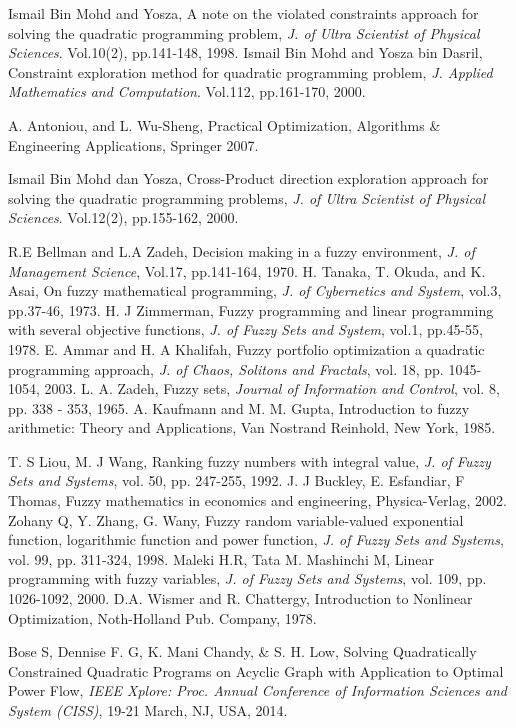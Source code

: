 \documentclass{iaesarticle3}
\begin{document}
\begin{thebibliography}{4}

    Ismail Bin Mohd and Yosza, A note on the violated constraints approach for solving the quadratic programming problem, \emph{J. of Ultra Scientist of Physical Sciences}.  Vol.10(2), pp.141-148, 1998.
    Ismail Bin Mohd and Yosza bin Dasril, Constraint exploration method for quadratic programming problem, \emph{J. Applied Mathematics and Computation}. Vol.112, pp.161-170, 2000.

    A. Antoniou, and L. Wu-Sheng, Practical Optimization, Algorithms \& Engineering Applications, Springer 2007.

    Ismail Bin Mohd dan Yosza, Cross-Product direction exploration approach for solving the quadratic programming problems, \emph{J. of Ultra Scientist of Physical Sciences}. Vol.12(2), pp.155-162, 2000.

    R.E Bellman and L.A Zadeh, Decision making in a fuzzy environment, \emph{J. of Management Science}, Vol.17, pp.141-164, 1970.
    H. Tanaka, T. Okuda, and K. Asai, On fuzzy mathematical programming, \emph{J. of Cybernetics and System}, vol.3, pp.37-46, 1973.
    H. J Zimmerman, Fuzzy programming and linear programming with several objective functions, \emph{J. of Fuzzy Sets and System}, vol.1, pp.45-55, 1978.
    E. Ammar and H. A Khalifah, Fuzzy portfolio optimization a quadratic programming approach, \emph{J. of Chaos, Solitons and Fractals}, vol. 18, pp. 1045-1054,  2003.
    L. A. Zadeh, Fuzzy sets, \emph{Journal of Information and Control}, vol. 8, pp. 338 - 353, 1965.
    A. Kaufmann and M. M. Gupta, Introduction to fuzzy arithmetic: Theory and Applications, Van Nostrand Reinhold, New York, 1985.

    T. S Liou, M. J Wang, Ranking fuzzy numbers with integral value, \emph{J. of Fuzzy Sets and Systems}, vol. 50, pp. 247-255, 1992.
    J. J Buckley, E. Esfandiar, F Thomas, Fuzzy mathematics in economics and engineering, Physica-Verlag, 2002.
    Zohany Q, Y. Zhang, G. Wany, Fuzzy random variable-valued exponential function, logarithmic function and power function, \emph{J. of Fuzzy Sets and Systems}, vol. 99, pp. 311-324, 1998.
    Maleki H.R, Tata M. Mashinchi M, Linear programming with fuzzy variables, \emph{J. of Fuzzy Sets and Systems}, vol. 109, pp. 1026-1092, 2000.
    D.A. Wismer and R. Chattergy, Introduction to Nonlinear Optimization, Noth-Holland Pub. Company, 1978.

    Bose S, Dennise F. G, K. Mani Chandy, \& S. H. Low, Solving Quadratically Constrained Quadratic Programs on Acyclic Graph with Application to Optimal Power Flow, \emph{IEEE Xplore: Proc. Annual Conference of Information Sciences and System (CISS)}, 19-21 March, NJ, USA, 2014.
\end{thebibliography}
\end{document}
